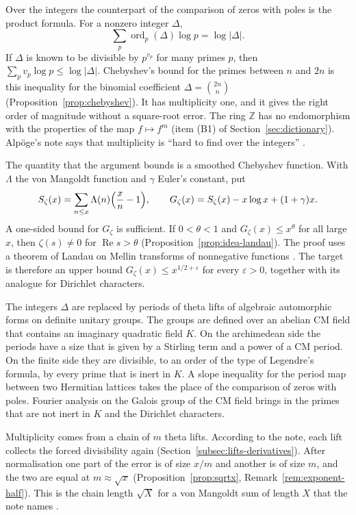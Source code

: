 \documentclass[11pt]{amsbook}
\theoremstyle{plain}
\theoremstyle{definition}
\theoremstyle{remark}
\numberwithin{equation}{section}
\numberwithin{figure}{chapter}
\numberwithin{table}{chapter}
\newcommand{\Z}{\mathbb{Z}}
\newcommand{\eps}{\varepsilon}
\newcommand{\Gz}{G_{\zeta}}
\newcommand{\Sz}{S_{\zeta}}
\newcommand{\ord}{\operatorname{ord}}
\begin{document}
Over the integers the counterpart of the comparison of zeros with
poles is the product formula. For a nonzero integer $\Delta$,
\[
  \sum_p\ord_p(\Delta)\log p=\log|\Delta| .
\]
If $\Delta$ is known to be divisible by $p^{v_p}$ for many primes
$p$, then $\sum_pv_p\log p\le\log|\Delta|$. Chebyshev's bound for
the primes between $n$ and $2n$ is this inequality for the
binomial coefficient $\Delta=\binom{2n}{n}$
(Proposition~\ref{prop:chebyshev}). It has multiplicity one, and it
gives the right order of magnitude without a square-root error.
The ring $\Z$ has no endomorphism with the properties of the map
$f\mapsto f^m$ (item (B1) of Section~\ref{sec:dictionary}).
Alp\"oge's note says that multiplicity is ``hard to find over the
integers'' \cite[p.~1]{AlpogeRemark2026}.

The quantity that the argument bounds is a smoothed Chebyshev
function. With $\Lambda$ the von Mangoldt function and $\gamma$
Euler's constant, put
\[
  \Sz(x)=\sum_{n\le x}\Lambda(n)\Bigl(\frac xn-1\Bigr),
  \qquad
  \Gz(x)=\Sz(x)-x\log x+(1+\gamma)x .
\]
A one-sided bound for $\Gz$ is sufficient. If $0<\theta<1$ and
$\Gz(x)\le x^\theta$ for all large $x$, then $\zeta(s)\ne0$ for
$\operatorname{Re}s>\theta$
(Proposition~\ref{prop:idea-landau}). The proof uses a theorem of
Landau on Mellin transforms of nonnegative functions
\cite{Landau1905}. The target is therefore an upper bound
$\Gz(x)\le x^{1/2+\eps}$ for every $\eps>0$, together with its
analogue for Dirichlet characters.

The integers $\Delta$ are replaced by periods of theta lifts of
algebraic automorphic forms on definite unitary groups. The groups
are defined over an abelian CM field that contains an imaginary
quadratic field $K$. On the archimedean side the periods have a
size that is given by a Stirling term and a power of a CM period.
On the finite side they are divisible, to an order of the type of
Legendre's formula, by every prime that is inert in $K$. A slope
inequality for the period map between two Hermitian lattices takes
the place of the comparison of zeros with poles. Fourier analysis
on the Galois group of the CM field brings in the primes that are
not inert in $K$ and the Dirichlet characters.

Multiplicity comes from a chain of $m$ theta lifts. According to
the note, each lift collects the forced divisibility again
(Section~\ref{subsec:lifts-derivatives}). After normalisation one part
of the error is of size $x/m$ and another is of size $m$, and the
two are equal at $m\approx\sqrt x$
(Proposition~\ref{prop:sqrtx}, Remark~\ref{rem:exponent-half}).
This is the chain length $\sqrt X$ for a von Mangoldt sum of
length $X$ that the note names \cite[p.~1]{AlpogeRemark2026}.
\end{document}
